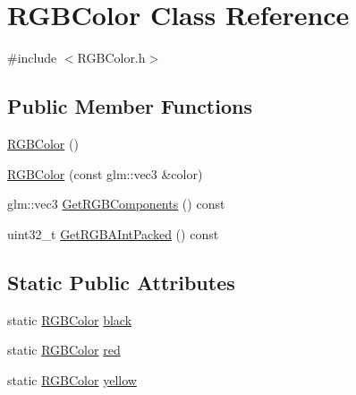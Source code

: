 \hypertarget{class_r_g_b_color}{\section{R\-G\-B\-Color Class Reference}
\label{class_r_g_b_color}
}


{\ttfamily \#include $<$R\-G\-B\-Color.\-h$>$}

\subsection*{Public Member Functions}
\begin{DoxyCompactItemize}
\item 
\hyperlink{class_r_g_b_color_a9383ce7b63b0a6ada5d4e54e16adf733}{R\-G\-B\-Color} ()
\item 
\hyperlink{class_r_g_b_color_a71d9de2c5f250a724d5b6d9987a601d8}{R\-G\-B\-Color} (const glm\-::vec3 \&color)
\item 
glm\-::vec3 \hyperlink{class_r_g_b_color_a76dfd542cdc5adf37c3c9c44b9e09832}{Get\-R\-G\-B\-Components} () const 
\item 
uint32\-\_\-t \hyperlink{class_r_g_b_color_aec124d79bc012abfc05deb11aedff25f}{Get\-R\-G\-B\-A\-Int\-Packed} () const 
\end{DoxyCompactItemize}
\subsection*{Static Public Attributes}
\begin{DoxyCompactItemize}
\item 
static \hyperlink{class_r_g_b_color}{R\-G\-B\-Color} \hyperlink{class_r_g_b_color_a39194ee333c3c6b2b499f7c320025c34}{black}
\item 
static \hyperlink{class_r_g_b_color}{R\-G\-B\-Color} \hyperlink{class_r_g_b_color_abf657524d06ec0fdb58568a548f12f8b}{red}
\item 
static \hyperlink{class_r_g_b_color}{R\-G\-B\-Color} \hyperlink{class_r_g_b_color_a850de47dd0a7df77ca32a0b5cc6703b7}{yellow}
\end{DoxyCompactItemize}


